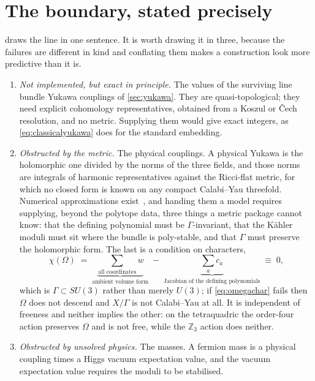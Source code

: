\documentclass[11pt,a4paper]{article}
\theoremstyle{definition}
\begin{document}
\section{The boundary, stated precisely}
\label{sec:boundary}

 draws the line in one sentence. It is worth drawing it
in three, because the failures are different in kind and conflating them makes
a construction look more predictive than it is.

\begin{enumerate}[leftmargin=2em]
\item \emph{Not implemented, but exact in principle.} The values of the
surviving line bundle Yukawa couplings of \cref{sec:yukawa}. They are
quasi-topological; they need explicit cohomology representatives, obtained
from a Koszul or \v{C}ech resolution, and no metric. Supplying them would give
exact integers, as \cref{eq:classicalyukawa} does for the standard embedding.

\item \emph{Obstructed by the metric.} The physical couplings. A physical
Yukawa is the holomorphic one divided by the norms of the three fields, and
those norms are integrals of harmonic representatives against the Ricci-flat
metric, for which no closed form is known on any compact Calabi--Yau
threefold. Numerical approximations exist~\cite{Larfors2022,HendiLarforsWalden2024, Butbaia2024}, and
handing them a model requires supplying, beyond the polytope data, three
things a metric package cannot know: that the defining polynomial must be
$\Gamma$-invariant, that the K\"ahler moduli must sit where the bundle is
poly-stable, and that $\Gamma$ must preserve the holomorphic form. The last is
a condition on characters,
%
\begin{equation}
\chi(\Omega) \;=\;
\underbrace{\sum_{\text{all coordinates}} w}_{\text{ambient volume form}}
\;-\;
\underbrace{\sum_a c_a}_{\text{Jacobian of the defining polynomials}}
\;\equiv\; 0 ,
\label{eq:omegachar}
\end{equation}
%
which is $\Gamma \subset SU(3)$ rather than merely $U(3)$; if
\cref{eq:omegachar} fails then $\Omega$ does not descend and $X/\Gamma$ is not
Calabi--Yau at all. It is independent of freeness and neither implies the
other: on the tetraquadric the order-four action preserves $\Omega$ and is not
free, while the $\mathbb{Z}_3$ action does neither.

\item \emph{Obstructed by unsolved physics.} The masses. A fermion mass is a
physical coupling times a Higgs vacuum expectation value, and the vacuum
expectation value requires the moduli to be stabilised.
\end{enumerate}
\end{document}
